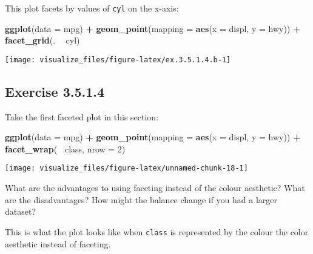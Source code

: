 \documentclass[]{book}
\newenvironment{Shaded}{\begin{snugshade}}{\end{snugshade}}
\newcommand{\DataTypeTok}[1]{\textcolor[rgb]{0.13,0.29,0.53}{#1}}
\newcommand{\DecValTok}[1]{\textcolor[rgb]{0.00,0.00,0.81}{#1}}
\newcommand{\KeywordTok}[1]{\textcolor[rgb]{0.13,0.29,0.53}{\textbf{#1}}}
\newcommand{\NormalTok}[1]{#1}
\newcommand{\OperatorTok}[1]{\textcolor[rgb]{0.81,0.36,0.00}{\textbf{#1}}}
\newcommand{\StringTok}[1]{\textcolor[rgb]{0.31,0.60,0.02}{#1}}
\theoremstyle{plain}
\theoremstyle{remark}
\begin{document}
This plot facets by values of \texttt{cyl} on the x-axis:

\begin{Shaded}
\begin{Highlighting}[]
\KeywordTok{ggplot}\NormalTok{(}\DataTypeTok{data =}\NormalTok{ mpg) }\OperatorTok{+}
\StringTok{  }\KeywordTok{geom_point}\NormalTok{(}\DataTypeTok{mapping =} \KeywordTok{aes}\NormalTok{(}\DataTypeTok{x =}\NormalTok{ displ, }\DataTypeTok{y =}\NormalTok{ hwy)) }\OperatorTok{+}
\StringTok{  }\KeywordTok{facet_grid}\NormalTok{(. }\OperatorTok{~}\StringTok{ }\NormalTok{cyl)}
\end{Highlighting}
\end{Shaded}

\begin{center}\texttt{[image: visualize\_files/figure-latex/ex.3.5.1.4.b-1]} \end{center}

\hypertarget{exercise-3.5.1.4}{%
\subsection*{\texorpdfstring{Exercise
{3.5.1.4}}{Exercise 3.5.1.4}}\label{exercise-3.5.1.4}}

Take the first faceted plot in this section:

\begin{Shaded}
\begin{Highlighting}[]
\KeywordTok{ggplot}\NormalTok{(}\DataTypeTok{data =}\NormalTok{ mpg) }\OperatorTok{+}
\StringTok{  }\KeywordTok{geom_point}\NormalTok{(}\DataTypeTok{mapping =} \KeywordTok{aes}\NormalTok{(}\DataTypeTok{x =}\NormalTok{ displ, }\DataTypeTok{y =}\NormalTok{ hwy)) }\OperatorTok{+}
\StringTok{  }\KeywordTok{facet_wrap}\NormalTok{(}\OperatorTok{~}\StringTok{ }\NormalTok{class, }\DataTypeTok{nrow =} \DecValTok{2}\NormalTok{)}
\end{Highlighting}
\end{Shaded}

\begin{center}\texttt{[image: visualize\_files/figure-latex/unnamed-chunk-18-1]} \end{center}

What are the advantages to using faceting instead of the colour
aesthetic? What are the disadvantages? How might the balance change if
you had a larger dataset?

This is what the plot looks like when \texttt{class} is represented by
the colour the color aesthetic instead of faceting.
\end{document}
